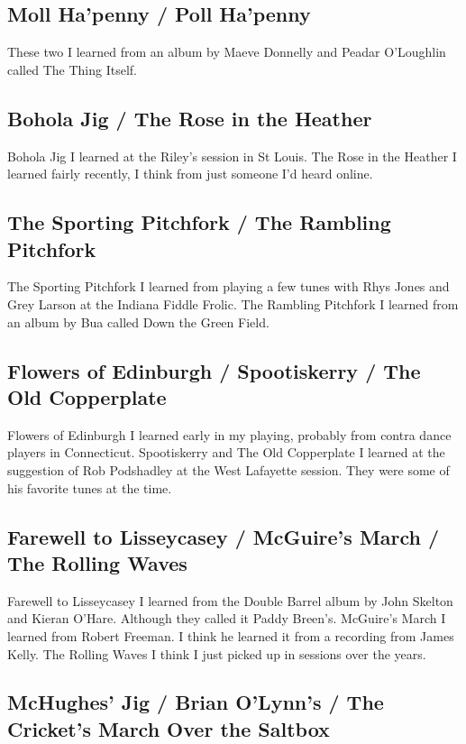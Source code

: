 \documentclass[9pt,letterpaper]{article}
\begin{document}
{\subsection{Moll Ha'penny / Poll Ha'penny}

These two I learned from an album by Maeve Donnelly and Peadar O'Loughlin called The Thing Itself.

\subsection{Bohola Jig / The Rose in the Heather}

Bohola Jig I learned at the Riley's session in St Louis. The Rose in the Heather I learned fairly recently, I think from just someone I'd heard online.

\subsection{The Sporting Pitchfork / The Rambling Pitchfork}

The Sporting Pitchfork I learned from playing a few tunes with Rhys Jones and Grey Larson at the Indiana Fiddle Frolic. The Rambling Pitchfork I learned from an album by Bua called Down the Green Field.

\subsection{Flowers of Edinburgh / Spootiskerry / The Old Copperplate}

Flowers of Edinburgh I learned early in my playing, probably from contra dance players in Connecticut. Spootiskerry and The Old Copperplate I learned at the suggestion of Rob Podshadley at the West Lafayette session. They were some of his favorite tunes at the time.

\subsection{Farewell to Lisseycasey / McGuire's March / The Rolling Waves}

Farewell to Lisseycasey I learned from the Double Barrel album by John Skelton and Kieran O'Hare. Although they called it Paddy Breen's. McGuire's March I learned from Robert Freeman. I think he learned it from a recording from James Kelly. The Rolling Waves I think I just picked up in sessions over the years. 

\subsection{McHughes' Jig / Brian O'Lynn's / The Cricket's March Over the Saltbox}

}
\end{document}
